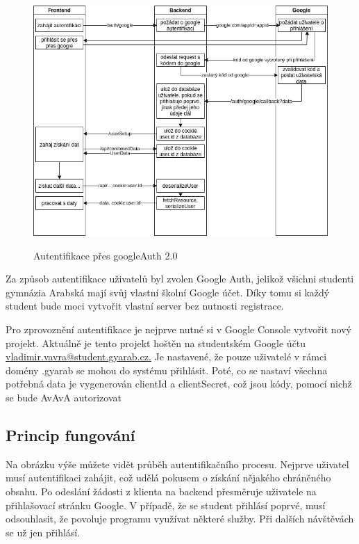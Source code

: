 \documentclass[a4paper,oneside,12pt]{report}
\begin{document}
\begin{figure}[h]
	\centering
	\includegraphics[height=9.5cm]{../img/authentication.png}
	\caption[Autentifikace přes googleAuth 2.0, vlastní tvorba]{Autentifikace přes googleAuth 2.0}
	\label{fig:architecture}
\end{figure}

Za způsob autentifikace uživatelů byl zvolen Google Auth, jelikož všichni studenti gymnázia Arabská mají svůj vlastní školní Google účet. Díky tomu si každý student bude moci vytvořit vlastní server bez nutnosti registrace.

Pro zprovoznění autentifikace je nejprve nutné si v Google Console vytvořit nový projekt.
Aktuálně je tento projekt hoštěn na studentském Google účtu \url{vladimir.vavra@student.gyarab.cz.} %
Je nastavené, že pouze uživatelé v rámci domény .gyarab se mohou do systému přihlásit.
Poté, co se nastaví všechna potřebná data je vygenerován clientId a clientSecret, což jsou kódy, pomocí nichž se bude AvAvA autorizovat

\subsection{Princip fungování}

Na obrázku výše můžete vidět průběh autentifikačního procesu.
Nejprve uživatel musí autentifikaci zahájit, což udělá pokusem o získání nějakého chráněného obsahu.
Po odeslání žádosti z klienta na backend přesměruje uživatele na přihlašovací stránku Google.
V případě, že se student přihlásí poprvé, musí odsouhlasit, že povoluje programu využívat některé služby.
Při dalších návštěvách se už jen přihlásí.
\end{document}

